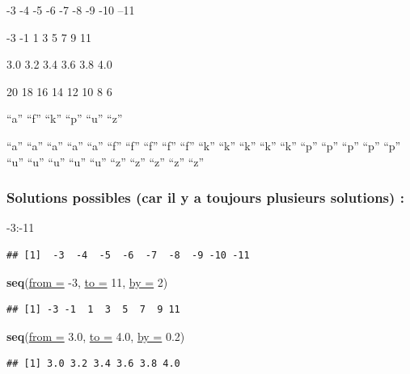 \documentclass[twoside,symmetric]{book}
\newenvironment{Shaded}{}{}
\newcommand{\DataTypeTok}[1]{\underline{#1}}
\newcommand{\DecValTok}[1]{#1}
\newcommand{\FloatTok}[1]{#1}
\newcommand{\KeywordTok}[1]{\textbf{#1}}
\newcommand{\NormalTok}[1]{#1}
\newcommand{\OperatorTok}[1]{#1}
\begin{document}
-3 -4 -5 -6 -7 -8 -9 -10 --11

-3 -1 1 3 5 7 9 11

3.0 3.2 3.4 3.6 3.8 4.0

20 18 16 14 12 10 8 6

``a'' ``f'' ``k'' ``p'' ``u'' ``z''

``a'' ``a'' ``a'' ``a'' ``a'' ``f'' ``f'' ``f'' ``f'' ``f'' ``k'' ``k'' ``k'' ``k'' ``k'' ``p'' ``p'' ``p'' ``p'' ``p'' ``u'' ``u'' ``u'' ``u'' ``u'' ``z'' ``z'' ``z'' ``z'' ``z''

\hypertarget{solutions-possibles-car-il-y-a-toujours-plusieurs-solutions}{%
\subsubsection{Solutions possibles (car il y a toujours plusieurs solutions) :}\label{solutions-possibles-car-il-y-a-toujours-plusieurs-solutions}}

\begin{Shaded}
\begin{Highlighting}[]
\DecValTok{-3}\OperatorTok{:-}\DecValTok{11}
\end{Highlighting}
\end{Shaded}

\begin{verbatim}
## [1]  -3  -4  -5  -6  -7  -8  -9 -10 -11
\end{verbatim}

\begin{Shaded}
\begin{Highlighting}[]
\KeywordTok{seq}\NormalTok{(}\DataTypeTok{from =} \DecValTok{-3}\NormalTok{, }\DataTypeTok{to =} \DecValTok{11}\NormalTok{, }\DataTypeTok{by =} \DecValTok{2}\NormalTok{)}
\end{Highlighting}
\end{Shaded}

\begin{verbatim}
## [1] -3 -1  1  3  5  7  9 11
\end{verbatim}

\begin{Shaded}
\begin{Highlighting}[]
\KeywordTok{seq}\NormalTok{(}\DataTypeTok{from =} \FloatTok{3.0}\NormalTok{, }\DataTypeTok{to =} \FloatTok{4.0}\NormalTok{, }\DataTypeTok{by =} \FloatTok{0.2}\NormalTok{)}
\end{Highlighting}
\end{Shaded}

\begin{verbatim}
## [1] 3.0 3.2 3.4 3.6 3.8 4.0
\end{verbatim}
\end{document}
